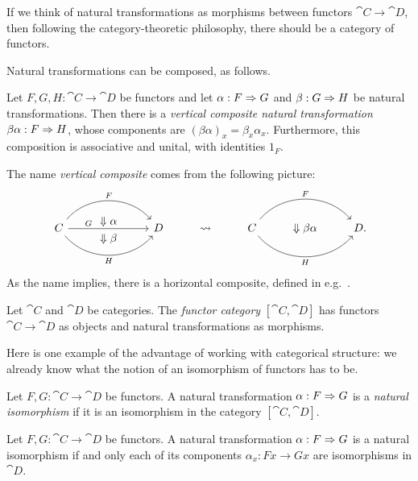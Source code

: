 If we think of natural transformations as morphisms between functors
$\cat{C}\to\cat{D}$, then following the category-theoretic philosophy, there
should be a category of functors.

Natural transformations can be composed, as follows.

\begin{prop}
  Let $F,G,H: \cat{C}\to\cat{D}$ be functors and let $\alpha: F\Rightarrow G$ and
  $\beta: G\Rightarrow H$ be natural transformations. Then there is a \emph{vertical
  composite  natural transformation} $\beta\alpha: F\Rightarrow H$, whose components are
  $(\beta\alpha)_x = \beta_x\alpha_x$. Furthermore, this composition is
  associative and unital, with identities $1_F$.
\end{prop}

The name \emph{vertical composite} comes from the following picture: \[
  \begin{tikzcd}[baseline=(current bounding box.center)]
    & \Downarrow\alpha \\[-28pt]
    C\ar[rr, "F", bend left=50]\ar[rr, "G", near start]\ar[rr, "H"', bend right=50] && D & \rightsquigarrow & C \ar[rr, "F", bend left=50]\ar[rr, "H"', bend right=50] & \Downarrow\beta\alpha & D\punctuation{.} \\[-25pt]
    & \Downarrow\beta
  \end{tikzcd}
\]
As the name implies, there is a horizontal composite, defined in
e.g.~\cite[Lemma 1.7.4]{riehl-2017}.

\begin{dfn}\label{def:functor category}
  Let $\cat{C}$ and $\cat{D}$ be categories. The \emph{functor category}
  $[\cat{C}, \cat{D}]$ has functors $\cat{C}\to\cat{D}$ as objects and natural
  transformations as morphisms.
\end{dfn}

Here is one example of the advantage of working with categorical structure: we
already know what the notion of an isomorphism of functors has to be.

\begin{dfn}\label{def:natural isomorphism}
  Let $F,G:\cat{C}\to\cat{D}$ be functors. A natural transformation $\alpha: F\Rightarrow G$ is a \emph{natural isomorphism} if
  it is an isomorphism in the category $[\cat{C}, \cat{D}]$.
\end{dfn}

\begin{prop}
  Let $F,G:\cat{C}\to\cat{D}$ be functors. A natural transformation $\alpha:
  F\Rightarrow G$ is a natural isomorphism if and only each of its components $\alpha_x:
  Fx\to Gx$ are isomorphisms in $\cat{D}$.
\end{prop}

